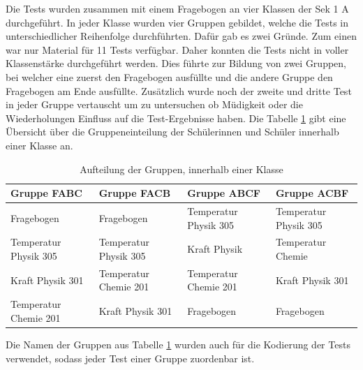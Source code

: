 Die Tests wurden zusammen mit einem Fragebogen an vier Klassen der Sek 1 A durchgeführt. In jeder Klasse wurden vier Gruppen gebildet, welche die Tests in unterschiedlicher Reihenfolge durchführten. Dafür gab es zwei Gründe. Zum einen war nur Material für 11 Tests verfügbar. Daher konnten die Tests nicht in voller Klassenstärke durchgeführt werden. Dies führte zur Bildung von zwei Gruppen, bei welcher eine zuerst den Fragebogen ausfüllte und die andere Gruppe den Fragebogen am Ende ausfüllte. Zusätzlich wurde noch der zweite und dritte Test in jeder Gruppe vertauscht um zu untersuchen ob Müdigkeit oder die Wiederholungen Einfluss auf die Test-Ergebnisse haben. Die Tabelle \ref{tab:Gruppenaufteilung} gibt eine Übersicht über die Gruppeneinteilung der Schülerinnen und Schüler innerhalb einer Klasse an.
\begin{table}[htbp]
  \centering
  \begin{tabular}{p{3.1cm}p{3.1cm}p{3.1cm}p{3.1cm}}
  \toprule
   Gruppe FABC & Gruppe FACB & Gruppe ABCF & Gruppe ACBF \\ 
  \midrule
   Fragebogen & Fragebogen & Temperatur \newline  Physik 305 & Temperatur \newline  Physik 305 \\[0.2cm]
   Temperatur \newline  Physik 305 & Temperatur \newline  Physik 305 & Kraft \newline  Physik & Temperatur Chemie \\ [0.2cm]
   Kraft  \newline Physik 301 & Temperatur \newline  Chemie 201 & Temperatur \newline  Chemie 201 & Kraft \newline  Physik 301 \\ [0.2cm]
   Temperatur \newline  Chemie 201 & Kraft \newline  Physik 301 & Fragebogen& Fragebogen\\ 
   
  \bottomrule
  \end{tabular} 
  \caption{Aufteilung der Gruppen, innerhalb einer Klasse}
  \label{tab:Gruppenaufteilung}
\end{table}

Die Namen der Gruppen aus Tabelle \ref{tab:Gruppenaufteilung} wurden auch für die Kodierung der Tests verwendet, sodass jeder Test einer Gruppe zuordenbar ist.

